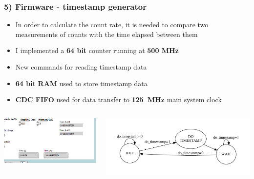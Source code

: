 \documentclass[aspectratio=169]{beamer}
\begin{document}
	\begin{frame}
		\frametitle{5) Firmware - timestamp generator}
		\vspace*{-0.525cm}
		\begin{itemize}
			\item In order to calculate the count rate, it is needed to compare two measurements of
			counts with the time elapsed between them
			\item I implemented a \textbf{64 bit} counter running at \textbf{500 MHz}
			\item New commands for reading timestamp data
			\item \textbf{64 bit} \textbf{RAM} used to store timestamp data 
			\item \textbf{CDC FIFO} used for data transfer to \textbf{125~MHz} main system clock 
		\end{itemize}
		\begin{columns}		
			\begin{center}
				\includegraphics[width=0.8 \textwidth]{IMG2/fig15}
			\end{center}
			\begin{center}
				\includegraphics[width=1.0 \textwidth]{IMG2/TimestampFSM}
			\end{center}
		\end{columns}
	\end{frame}
\end{document}
